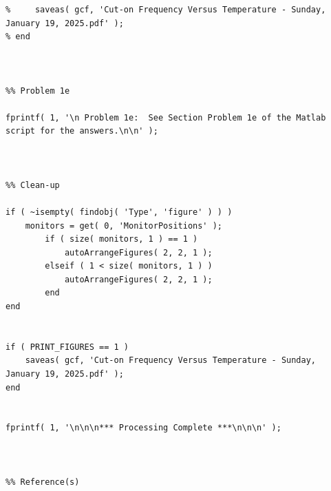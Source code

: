 \begin{lstlisting}[style=Matlab-editor, basicstyle=\mlttfamily, numbers=none, keepspaces, mlshowsectionrules]
% if ( PRINT_FIGURES == 1 )
%     saveas( gcf, 'Cut-on Frequency Versus Temperature - Sunday, January 19, 2025.pdf' );
% end



%% Problem 1e

fprintf( 1, '\n Problem 1e:  See Section Problem 1e of the Matlab script for the answers.\n\n' );



%% Clean-up

if ( ~isempty( findobj( 'Type', 'figure' ) ) )
    monitors = get( 0, 'MonitorPositions' );
        if ( size( monitors, 1 ) == 1 )
            autoArrangeFigures( 2, 2, 1 );
        elseif ( 1 < size( monitors, 1 ) )
            autoArrangeFigures( 2, 2, 1 );
        end
end


if ( PRINT_FIGURES == 1 )
    saveas( gcf, 'Cut-on Frequency Versus Temperature - Sunday, January 19, 2025.pdf' );
end


fprintf( 1, '\n\n\n*** Processing Complete ***\n\n\n' );



%% Reference(s)
\end{lstlisting}











































